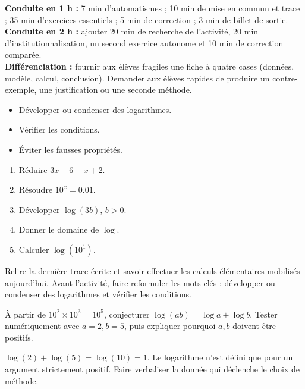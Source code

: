 \ifmxteacher
\begin{method}
\textbf{Conduite en 1 h :} 7 min d'automatismes ; 10 min de mise en commun et trace ; 35 min d'exercices essentiels ; 5 min de correction ; 3 min de billet de sortie.\\
\textbf{Conduite en 2 h :} ajouter 20 min de recherche de l'activité, 20 min d'institutionnalisation, un second exercice autonome et 10 min de correction comparée.\\
\textbf{Différenciation :} fournir aux élèves fragiles une fiche à quatre cases (données, modèle, calcul, conclusion). Demander aux élèves rapides de produire un contre-exemple, une justification ou une seconde méthode.
\end{method}
\fi
{}
\begin{objectives}\begin{itemize}\item Développer ou condenser des logarithmes.\item Vérifier les conditions.\item Éviter les fausses propriétés.\end{itemize}\end{objectives}
\begin{fluency}\begin{enumerate}\item Réduire $3x+6-x+2$. \item Résoudre $10^x=\num{0,01}$. \item Développer $\log(3b)$, $b>0$. \item Donner le domaine de $\log$. \mxblank{$]0,+\infty[$}\item Calculer $\log(10^1)$. \end{enumerate}\end{fluency}
\begin{prerequisites}Relire la dernière trace écrite et savoir effectuer les calculs élémentaires mobilisés aujourd'hui. Avant l'activité, faire reformuler les mots-clés : développer ou condenser des logarithmes et vérifier les conditions.\end{prerequisites}

\begin{activity}
À partir de $10^2\times10^3=10^5$, conjecturer $\log(ab)=\log a+\log b$. Tester numériquement avec $a=2,b=5$, puis expliquer pourquoi $a,b$ doivent être positifs.

\end{activity}
\begin{solution}$\log(2)+\log(5)=\log(10)=1$. Le logarithme n'est défini que pour un argument strictement positif. Faire verbaliser la donnée qui déclenche le choix de méthode.\end{solution}

